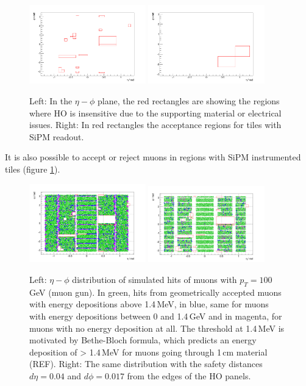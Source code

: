 			\begin{figure}[htbp]
				\centering
				\includegraphics[width=0.45\textwidth]{Figures/erdogan/deadregions.png}
				\includegraphics[width=0.45\textwidth]{Figures/erdogan/sipmregions.png}
				\caption{Left: In the $\eta-\phi$ plane, the red rectangles are showing the regions where HO is insensitive due to the supporting material or electrical issues. Right: In red rectangles the
				acceptance regions for tiles with SiPM readout.}
				\label{fig:ho_acceptance}
			\end{figure}
			It is also possible to accept or reject muons in regions with SiPM instrumented tiles (figure \ref{fig:ho_acceptance}).
			\begin{figure}[htbp]
				\centering
				\includegraphics[width=0.45\textwidth]{Figures/erdogan/simhits_wo_deta_dphi.png}
				\includegraphics[width=0.45\textwidth]{Figures/erdogan/simhits_with_deta_dphi.png}
				\caption{Left: $\eta-\phi$ distribution of simulated hits of muons with $p_T = 100$\,GeV (muon gun). In green, hits from geometrically accepted muons with energy depositions above 1.4\,MeV, in
				blue, same for muons with energy depositions between 0 and 1.4\,GeV and in magenta, for muons with no energy deposition at all. The threshold at 1.4\,MeV is motivated by Bethe-Bloch formula, which
				predicts an energy deposition of > 1.4\,MeV for muons going through 1\,cm material (REF). Right: The same distribution with the safety distances $d\eta = 0.04$ and $d\phi = 0.017$ from the edges
				of the HO panels.}
				\label{fig:simhits_in_acceptance}
			\end{figure}
